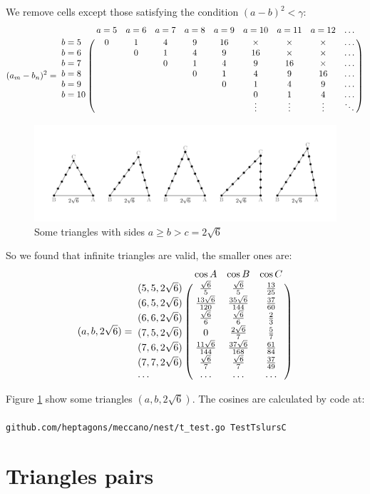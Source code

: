 \documentclass[11pt]{article}
\begin{document}
We remove cells except those satisfying the condition $(a-b)^2 < \gamma$:
\begin {equation}\label{E:21}
(a_m - b_n)^2 =\bordermatrix{~ & a=5 & a=6 & a=7 & a=8 & a=9 & a=10 & a=11 & a=12 & \hdots\cr
b=5  & 0 & 1 & 4 &  9 & 16 & \times & \times & \times & \hdots \cr    
b=6  &   & 0 & 1 &  4 &  9 & 16 & \times & \times & \hdots \cr    
b=7  &   &   & 0 &  1 &  4 &  9 & 16 & \times & \hdots \cr    
b=8  &   &   &   &  0 &  1 &  4 &  9 & 16 & \hdots \cr    
b=9  &   &   &   &    &  0 &  1 &  4 &  9 & \hdots \cr    
b=10 &   &   &   &    &    &  0 &  1 &  4 & \hdots \cr    
 &  &  &  &  &  & \vdots & \vdots & \vdots & \ddots \cr}
\end {equation}

\begin{figure}[htp]
\centering
\includegraphics[scale=0.9]{tslurC}
\caption{Some triangles with sides $a \ge b > c = 2\sqrt{6}$}
\label{tslurC}
\end{figure}

So we found that infinite triangles are valid, the smaller ones are:
\begin {equation}\label{E:4}
(a,b,2\sqrt{6}) =\bordermatrix{~ & \cos{A} & \cos{B} & \cos{C} \cr
(5,5,2\sqrt{6}) & \frac{\sqrt{6}}{5} & \frac{\sqrt{6}}{5} & \frac{13}{25} \cr
(6,5,2\sqrt{6}) & \frac{13\sqrt{6}}{120} & \frac{35\sqrt{6}}{144} & \frac{37}{60} \cr
(6,6,2\sqrt{6}) & \frac{\sqrt{6}}{6} & \frac{\sqrt{6}}{6} & \frac{2}{3} \cr
(7,5,2\sqrt{6}) & 0 & \frac{2\sqrt{6}}{7} & \frac{5}{7} \cr
(7,6,2\sqrt{6}) & \frac{11\sqrt{6}}{144} & \frac{37\sqrt{6}}{168} & \frac{61}{84} \cr
(7,7,2\sqrt{6}) & \frac{\sqrt{6}}{7} & \frac{\sqrt{6}}{7} & \frac{37}{49} \cr
\hdots & \hdots & \hdots & \hdots \cr}
\end{equation}

Figure \ref{tslurC} show some triangles $(a,b,2\sqrt{6})$. The cosines are calculated by code at:
\\\\
\texttt{github.com/heptagons/meccano/nest/t\_test.go TestTslursC}

\section{Triangles pairs}
\end{document}
